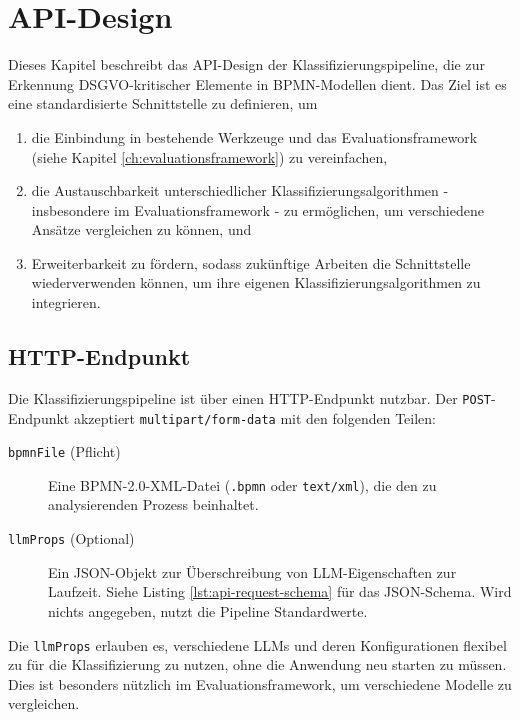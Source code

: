 \section{API-Design}\label{sec:api}

Dieses Kapitel beschreibt das API-Design der Klassifizierungspipeline, die zur Erkennung \ac{DSGVO}-kritischer Elemente in \ac{BPMN}-Modellen dient. Das Ziel ist es eine standardisierte Schnittstelle zu definieren, um

\begin{enumerate}
    \item die Einbindung in bestehende Werkzeuge und das Evaluationsframework (siehe Kapitel \ref{ch:evaluationsframework}) zu vereinfachen,
    \item die Austauschbarkeit unterschiedlicher Klassifizierungsalgorithmen - insbesondere im Evaluationsframework - zu ermöglichen, um verschiedene Ansätze vergleichen zu können, und
    \item Erweiterbarkeit zu fördern, sodass zukünftige Arbeiten die Schnittstelle wiederverwenden können, um ihre eigenen Klassifizierungsalgorithmen zu integrieren.
\end{enumerate}

\subsection*{HTTP-Endpunkt}

Die Klassifizierungspipeline ist über einen HTTP-Endpunkt nutzbar. Der \texttt{POST}-Endpunkt akzeptiert \texttt{multipart/form-data} mit den folgenden Teilen:

\begin{description}
    \item[\texttt{bpmnFile} (Pflicht)] Eine BPMN-2.0-XML-Datei (\texttt{.bpmn} oder \texttt{text/xml}), die den zu analysierenden Prozess beinhaltet.
    \item[\texttt{llmProps} (Optional)] Ein JSON-Objekt zur Überschreibung von \ac{LLM}-Eigenschaften zur Laufzeit. Siehe Listing \ref{lst:api-request-schema} für das JSON-Schema. Wird nichts angegeben, nutzt die Pipeline Standardwerte.
\end{description}

Die \texttt{llmProps} erlauben es, verschiedene \acp{LLM} und deren Konfigurationen flexibel zu für die Klassifizierung zu nutzen, ohne die Anwendung neu starten zu müssen. Dies ist besonders nützlich im Evaluationsframework, um verschiedene Modelle zu vergleichen.

